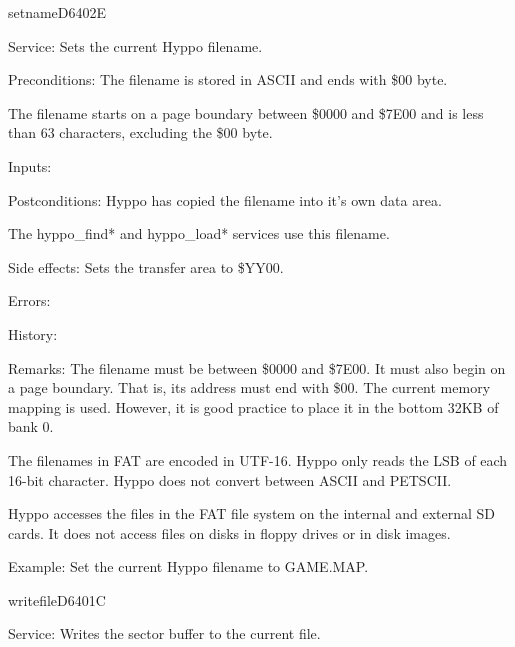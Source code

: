 \newpage
\begin{hyppotrap}{setname}{D640}{2E}
\item [Service:]
  Sets the current Hyppo filename.
\item [Preconditions:]
  The filename is stored in ASCII and ends with \$00 byte.

  The filename starts on a page boundary between \$0000 and \$7E00 and is less
  than 63 characters, excluding the \$00 byte.
\item [Inputs:]
\item [Postconditions:]
  Hyppo has copied the filename into it's own data area.

  The hyppo\_find* and hyppo\_load* services use this filename.
\item [Side effects:]
  Sets the transfer area to \$YY00.
\item [Errors:]
\item [History:]
\item [Remarks:]
  The filename must be between \$0000 and \$7E00. It must also begin on a
  page boundary. That is, its address must end with \$00. The current memory
  mapping is used. However, it is good practice to place it in the bottom 32KB
  of bank 0.

  The filenames in FAT are encoded in UTF-16. Hyppo only reads the LSB
  of each 16-bit character. Hyppo does not convert between ASCII and
  PETSCII.

  Hyppo accesses the files in the FAT file system on the internal and
  external SD cards. It does not access files on disks in floppy drives or in
  disk images.
\item [Example:]
  Set the current Hyppo filename to GAME.MAP.
\end{hyppotrap}


\newpage
\begin{hyppotrap}{writefile}{D640}{1C}
\item [Service:]
  Writes the sector buffer to the current file.
\notimplemented
\end{hyppotrap}



